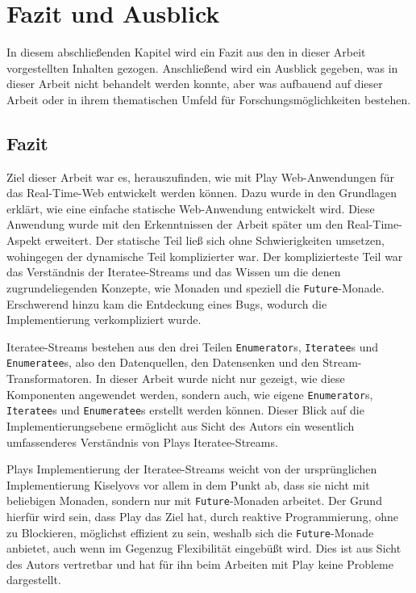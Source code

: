 
\chapter{Fazit und Ausblick} %
\label{cha:fazit_und_ausblick}

In diesem abschließenden Kapitel wird ein Fazit aus den in dieser Arbeit vorgestellten Inhalten gezogen.
Anschließend wird ein Ausblick gegeben, was in dieser Arbeit nicht behandelt werden konnte, aber was aufbauend auf dieser Arbeit oder in ihrem thematischen Umfeld für Forschungsmöglichkeiten bestehen.

\section{Fazit} %
\label{sec:fazit}

Ziel dieser Arbeit war es, herauszufinden, wie mit Play Web-Anwendungen für das Real-Time-Web entwickelt werden können.
Dazu wurde in den Grundlagen erklärt, wie eine einfache statische Web-Anwendung entwickelt wird.
Diese Anwendung wurde mit den Erkenntnissen der Arbeit später um den Real-Time-Aspekt erweitert.
Der statische Teil ließ sich ohne Schwierigkeiten umsetzen, wohingegen der dynamische Teil komplizierter war.
Der komplizierteste Teil war das Verständnis der Iteratee-Streams und das Wissen um die denen zugrundeliegenden Konzepte, wie Monaden und speziell die \lstinline|Future|-Monade.
Erschwerend hinzu kam die Entdeckung eines Bugs, wodurch die Implementierung verkompliziert wurde.

Iteratee-Streams bestehen aus den drei Teilen \lstinline|Enumerator|s, \lstinline|Iteratee|s und \lstinline|Enumeratee|s, also den Datenquellen, den Datensenken und den Stream-Transformatoren.
In dieser Arbeit wurde nicht nur gezeigt, wie diese Komponenten angewendet werden, sondern auch, wie eigene \lstinline|Enumerator|s, \lstinline|Iteratee|s und \lstinline|Enumeratee|s erstellt werden können.
Dieser Blick auf die Implementierungsebene ermöglicht aus Sicht des Autors ein wesentlich umfassenderes Verständnis von Plays Iteratee-Streams.

Plays Implementierung der Iteratee-Streams weicht von der ursprünglichen Implementierung Kiselyovs vor allem in dem Punkt ab, dass sie nicht mit beliebigen Monaden, sondern nur mit \lstinline|Future|-Monaden arbeitet.
Der Grund hierfür wird sein, dass Play das Ziel hat, durch reaktive Programmierung, ohne zu Blockieren, möglichst effizient zu sein, weshalb sich die \lstinline|Future|-Monade anbietet, auch wenn im Gegenzug Flexibilität eingebüßt wird.
Dies ist aus Sicht des Autors vertretbar und hat für ihn beim Arbeiten mit Play keine Probleme dargestellt.


